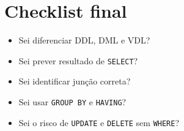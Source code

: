 \documentclass[12pt,a4paper]{article}
\begin{document}
\section{Checklist final}
\begin{itemize}
    \item Sei diferenciar DDL, DML e VDL?
    \item Sei prever resultado de \texttt{SELECT}?
    \item Sei identificar junção correta?
    \item Sei usar \texttt{GROUP BY} e \texttt{HAVING}?
    \item Sei o risco de \texttt{UPDATE} e \texttt{DELETE} sem \texttt{WHERE}?
\end{itemize}
\end{document}
